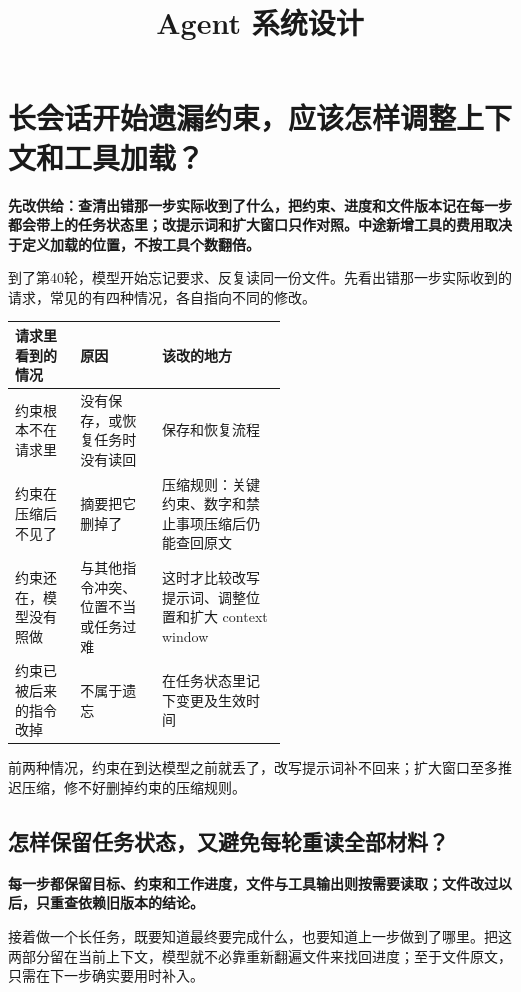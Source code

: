 \documentclass[a4paper,11pt]{ctexart}
\title{\songtifont\huge Agent 系统设计}
\author{}
\date{}
\begin{document}
\maketitle
\thispagestyle{empty}

\clearpage
\section{长会话开始遗漏约束，应该怎样调整上下文和工具加载？}
\noindent\textbf{先改供给：查清出错那一步实际收到了什么，把约束、进度和文件版本记在每一步都会带上的任务状态里；改提示词和扩大窗口只作对照。中途新增工具的费用取决于定义加载的位置，不按工具个数翻倍。}\par\medskip

到了第40轮，模型开始忘记要求、反复读同一份文件。先看出错那一步实际收到的请求，常见的有四种情况，各自指向不同的修改。

\begingroup\small\setlength{\tabcolsep}{5pt}\renewcommand{\arraystretch}{1.25}\keepXColumns
\begin{tabularx}{\linewidth}{L{0.24\linewidth} L{0.30\linewidth} X}
\toprule
\textbf{请求里看到的情况} & \textbf{原因} & \textbf{该改的地方} \\
\midrule
约束根本不在请求里 & 没有保存，或恢复任务时没有读回 & 保存和恢复流程 \\
约束在压缩后不见了 & 摘要把它删掉了 & 压缩规则：关键约束、数字和禁止事项压缩后仍能查回原文 \\
约束还在，模型没有照做 & 与其他指令冲突、位置不当或任务过难 & 这时才比较改写提示词、调整位置和扩大 context window \\
约束已被后来的指令改掉 & 不属于遗忘 & 在任务状态里记下变更及生效时间 \\
\bottomrule
\end{tabularx}
\endgroup

前两种情况，约束在到达模型之前就丢了，改写提示词补不回来；扩大窗口至多推迟压缩，修不好删掉约束的压缩规则。

\subsection{怎样保留任务状态，又避免每轮重读全部材料？}
\noindent\textbf{每一步都保留目标、约束和工作进度，文件与工具输出则按需要读取；文件改过以后，只重查依赖旧版本的结论。}\par\medskip

接着做一个长任务，既要知道最终要完成什么，也要知道上一步做到了哪里。把这两部分留在当前上下文，模型就不必靠重新翻遍文件来找回进度；至于文件原文，只需在下一步确实要用时补入。
\end{document}
